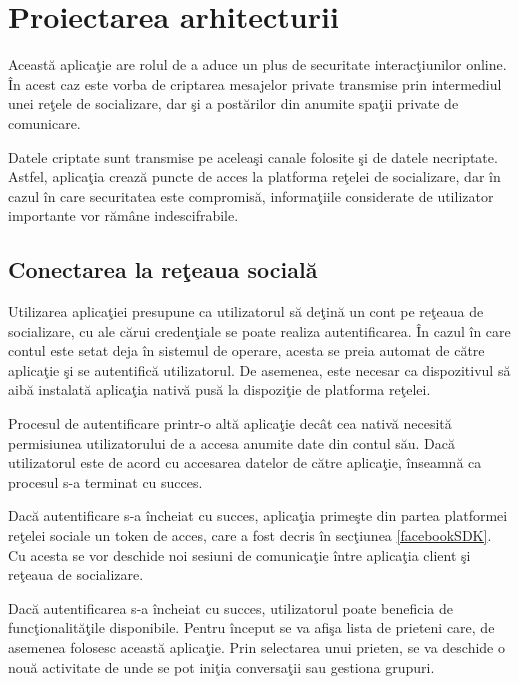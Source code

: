 \chapter{Proiectarea arhitecturii}

Aceast\u{a} aplica\c{t}ie are rolul de a aduce un plus de securitate interac\c{t}iunilor online. \^{I}n acest caz este vorba de criptarea mesajelor private transmise prin intermediul unei re\c{t}ele de socializare, dar \c{s}i a post\u{a}rilor din anumite spa\c{t}ii private de comunicare.

Datele criptate sunt transmise pe acelea\c{s}i canale folosite \c{s}i de datele necriptate. Astfel, aplica\c{t}ia creaz\u{a} puncte de acces la platforma re\c{t}elei de socializare, dar \^{i}n cazul \^{i}n care securitatea este compromis\u{a}, informa\c{t}iile considerate de utilizator importante vor r\u{a}m\^{a}ne indescifrabile.


\section{Conectarea la re\c{t}eaua social\u{a}}

Utilizarea aplica\c{t}iei presupune ca utilizatorul s\u{a} de\c{t}in\u{a} un cont pe re\c{t}eaua de socializare, cu ale c\u{a}rui creden\c{t}iale se poate realiza autentificarea. \^{I}n cazul \^{i}n care contul este setat deja \^{i}n sistemul de operare, acesta se preia automat de c\u{a}tre aplica\c{t}ie \c{s}i se autentific\u{a} utilizatorul. De asemenea, este necesar ca dispozitivul s\u{a} aib\u{a} instalat\u{a} aplica\c{t}ia nativ\u{a} pus\u{a} la dispozi\c{t}ie de platforma re\c{t}elei.

Procesul de autentificare printr-o alt\u{a} aplica\c{t}ie dec\^{a}t cea nativ\u{a} necesit\u{a} permisiunea utilizatorului de a accesa anumite date din contul s\u{a}u. Dac\u{a} utilizatorul este de acord cu accesarea datelor de c\u{a}tre aplica\c{t}ie, \^{i}nseamn\u{a} ca procesul s-a terminat cu succes.

Dac\u{a} autentificare s-a \^{i}ncheiat cu succes, aplica\c{t}ia prime\c{s}te din partea platformei re\c{t}elei sociale un token de acces, care a fost decris \^{i}n sec\c{t}iunea \ref{facebookSDK}. Cu acesta se vor deschide noi sesiuni de comunica\c{t}ie \^{i}ntre aplica\c{t}ia client \c{s}i re\c{t}eaua de socializare.

Dac\u{a} autentificarea s-a \^{i}ncheiat cu succes, utilizatorul poate beneficia de func\c{t}ionalit\u{a}\c{t}ile disponibile. Pentru \^{i}nceput se va afi\c{s}a lista de prieteni care, de asemenea folosesc aceast\u{a} aplica\c{t}ie. Prin selectarea unui prieten, se va deschide o nou\u{a} activitate de unde se pot ini\c{t}ia conversa\c{t}ii sau gestiona grupuri.


